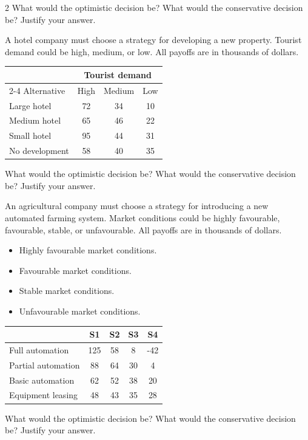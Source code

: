 \begin{multicols}{2}
		 What would the optimistic decision be? What would the conservative decision be? Justify your answer.
		
		
		A hotel company must choose a strategy for developing a new property. Tourist demand could be high, medium, or low. All payoffs are in thousands of dollars.
		
		\begin{center}
			\renewcommand{\arraystretch}{1.3}
			\small
			\begin{tabular}{lccc}
				\toprule
				& \multicolumn{3}{c}{Tourist demand} \\
				\cmidrule(lr){2-4}
				Alternative & High & Medium & Low \\
				\midrule
				Large hotel & 72 & 34 & 10 \\
				Medium hotel & 65 & 46 & 22 \\
				Small hotel & 95 & 44 & 31 \\
				No development & 58 & 40 & 35 \\
				\bottomrule
			\end{tabular}
		\end{center}
		
		What would the optimistic decision be? What would the conservative decision be? Justify your answer.
		
		
		\columnbreak
		
		
		An agricultural company must choose a strategy for introducing a new automated farming system. Market conditions could be highly favourable, favourable, stable, or unfavourable. All payoffs are in thousands of dollars.
		
		\begin{itemize}
			\item[\textbf{S1}] Highly favourable market conditions.
			\item[\textbf{S2}] Favourable market conditions.
			\item[\textbf{S3}] Stable market conditions.
			\item[\textbf{S4}] Unfavourable market conditions.
		\end{itemize}
		
		\begin{center}
			\renewcommand{\arraystretch}{1.3}
			\small
			\begin{tabular}{lcccc}
				\toprule
				& S1 & S2 & S3 & S4 \\
				\midrule
				Full automation & 125 & 58 & 8 & -42 \\
				Partial automation & 88 & 64 & 30 & 4 \\
				Basic automation & 62 & 52 & 38 & 20 \\
				Equipment leasing & 48 & 43 & 35 & 28 \\
				\bottomrule
			\end{tabular}
		\end{center}
		
		What would the optimistic decision be? What would the conservative decision be? Justify your answer.
		
	\end{multicols}
	
